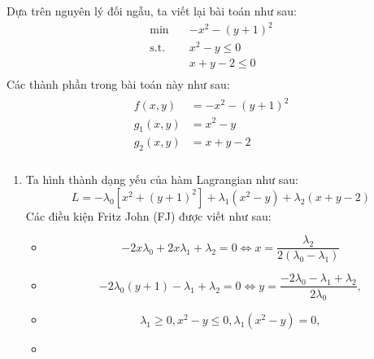 \begin{solution}

    Dựa trên nguyên lý đối ngẫu, ta viết lại bài toán như sau:
    \begin{equation}
        \begin{aligned}
            \min \quad & -x^2 - (y+1)^2\\
            \textrm{s.t.} \quad & x^2 - y \leq 0\\
              &x + y - 2\leq 0   \\
        \end{aligned}
    \end{equation}
    Các thành phần trong bài toán này như sau:
    \begin{align}
        \begin{aligned}
            f(x,y) &= -x^2 - (y+1)^2\\
            g_1(x,y) &= x^2 - y\\
            g_2(x, y) &= x + y - 2\\
        \end{aligned}
    \end{align}
    \begin{enumerate}[label=(\alph*)]
        \item Ta hình thành dạng yếu của hàm Lagrangian như sau:
        \begin{equation}
            L = -\lambda_0\left[x^2 + (y+1)^2\right] + \lambda_1(x^2 - y) + \lambda_2(x+y-2)
        \end{equation}
        Các điều kiện Fritz John (FJ) được viết như sau:
        \begin{itemize}
            \item \begin{equation}
                -2x\lambda_0 +2x\lambda_1 + \lambda_2 = 0 \Leftrightarrow x = \dfrac{\lambda_2}{2(\lambda_0 - \lambda_1)}
            \end{equation}
            \item \begin{equation}
                -2\lambda_0(y+1) -\lambda_1 + \lambda_2 = 0 \Leftrightarrow y = \dfrac{-2\lambda_0 - \lambda_1 + \lambda_2}{2\lambda_0},
            \end{equation}
            \item \begin{equation}
                \lambda_1 \geq 0, x^2 - y \leq 0, \lambda_1 (x^2 - y) = 0,
            \end{equation}
            \item \begin{equation}

\end{equation}
\end{itemize}
\end{enumerate}
\end{solution}
